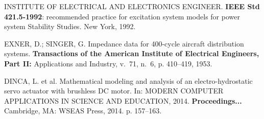 \begin{thebibliography}{}
{INSTITUTE OF ELECTRICAL AND ELECTRONICS ENGINEER. \textbf{IEEE Std 421.5-1992}:
  recommended practice for excitation system models for power system
  Stability Studies. New York, 1992.}

{EXNER, D.; SINGER, G. Impedance data for 400-cycle aircraft distribution
  systems.
\textbf{Transactions of the American Institute of Electrical Engineers, Part II:}
  Applications and Industry, v.~71, n.~6, p. 410--419, 1953.}

{DINCA, L. et al. Mathematical modeling and analysis of an electro-hydrostatic
  servo actuator with brushless {DC} motor. In: \uppercase{Modern
  Computer Applications in Science and Education}, 2014. \textbf{Proceedings...} Cambridge, MA: WSEAS
  Press, 2014. p. 157--163.}

\end{thebibliography}
